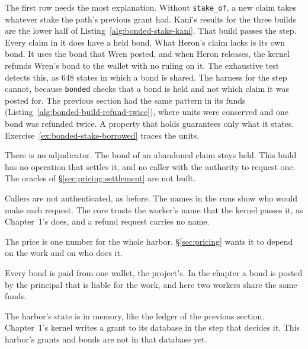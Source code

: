 The first row needs the most explanation. Without \texttt{stake\_of}, a
new claim takes whatever stake the path's previous grant had. Kani's
results for the three builds are the lower half of
Listing~\ref{alg:bonded-stake-kani}. That build passes the step. Every
claim in it does have a held bond. What Heron's claim lacks is its own
bond. It uses the bond that Wren posted, and when Heron releases, the
kernel refunds Wren's bond to the wallet with no ruling on it. The
exhaustive test detects this, as 648 states in which a bond is shared. The
harness for the step cannot, because \texttt{bonded} checks that a bond is
held and not which claim it was posted for. The previous section had the
same pattern in its funds (Listing~\ref{alg:bonded-build-refund-twice}),
where units were conserved and one bond was refunded twice. A property
that holds guarantees only what it states.
Exercise~\ref{ex:bonded-stake-borrowed} traces the units.

\begin{pdboundary}
\setlength{\parskip}{4pt plus 1pt}
There is no adjudicator. The bond of an abandoned claim stays held. This
build has no operation that settles it, and no caller with the authority
to request one. The oracles of \S\ref{sec:pricing:settlement} are not
built.

Callers are not authenticated, as before. The names in the runs show who
would make each request. The core trusts the worker's name that the kernel
passes it, as Chapter~1's does, and a refund request carries no name.

The price is one number for the whole harbor. \S\ref{sec:pricing} wants it
to depend on the work and on who does it.

Every bond is paid from one wallet, the project's. In the chapter a bond
is posted by the principal that is liable for the work, and here two
workers share the same funds.

The harbor's state is in memory, like the ledger of the previous section.
Chapter~1's kernel writes a grant to its database in the step that decides
it. This harbor's grants and bonds are not in that database yet.
\end{pdboundary}
